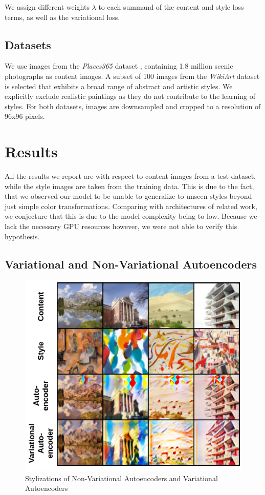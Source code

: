 \documentclass[10pt,twocolumn,letterpaper]{article}
\begin{document}
We assign different weights $\lambda$ to each summand of the content and style loss terms, as well as the variational loss.

\subsection{Datasets}

We use images from the \textit{Places365} dataset \cite{places365}, containing 1.8 million scenic photographs as content images. A subset of 100 images from the \textit{WikiArt} dataset is selected that exhibits a broad range of abstract and artistic styles. We explicitly exclude realistic paintings as they do not contribute to the learning of styles. For both datasets, images are downsampled and cropped to a resolution of 96x96 pixels.

\section{Results}

All the results we report are with respect to content images from a test dataset, while the style images are taken from the training data. This is due to the fact, that we observed our model to be unable to generalize to unseen styles beyond just simple color transformations. Comparing with architectures of related work, we conjecture that this is due to the model complexity being to low. Because we lack the necessary GPU resources however, we were not able to verify this hypothesis.

\subsection{Variational and Non-Variational Autoencoders}
	
\begin{figure}
\centering
\includegraphics[width=0.9\linewidth]{ae_vs_vae.png}
\caption{Stylizations of Non-Variational Autoencoders and Variational Autoencoders}
\label{fig:ae_vae}
\end{figure}
\end{document}
